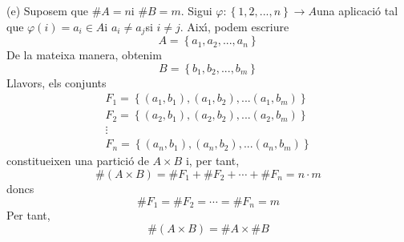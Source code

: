 \begin{solucio}
(e) Suposem que $\#A=n$i $\#B=m$. Sigui $\varphi :\left\{ 1,2,...,n\right\}
\longrightarrow A$una aplicaci\'{o} tal que $\varphi (i)=a_{i}\in A$i $%
a_{i}\neq a_{j}$si $i\neq j$. Aix\'{\i}, podem escriure%
\begin{equation*}
A=\left\{ a_{1},a_{2},...,a_{n}\right\}
\end{equation*}%
De la mateixa manera, obtenim%
\begin{equation*}
B=\left\{ b_{1},b_{2},...,b_{m}\right\}
\end{equation*}%
Llavors, els conjunts%
\begin{equation*}
\begin{array}{c}
F_{1}=\left\{ (a_{1},b_{1}),(a_{1},b_{2}),...(a_{1},b_{m})\right\} \\
F_{2}=\left\{ (a_{2},b_{1}),(a_{2},b_{2}),...(a_{2},b_{m})\right\} \\
\vdots \\
F_{n}=\left\{ (a_{n},b_{1}),(a_{n},b_{2}),...(a_{n},b_{m})\right\}%
\end{array}%
\end{equation*}%
constitueixen una partici\'{o} de $A\times B$ i, per tant,%
\begin{equation*}
\#\left( A\times B\right) =\#F_{1}+\#F_{2}+\cdots +\#F_{n}=n\cdot m
\end{equation*}%
doncs%
\begin{equation*}
\#F_{1}=\#F_{2}=\cdots =\#F_{n}=m
\end{equation*}%
Per tant,%
\begin{equation*}
\#\left( A\times B\right) =\#A\times \#B
\end{equation*}


\end{solucio}
